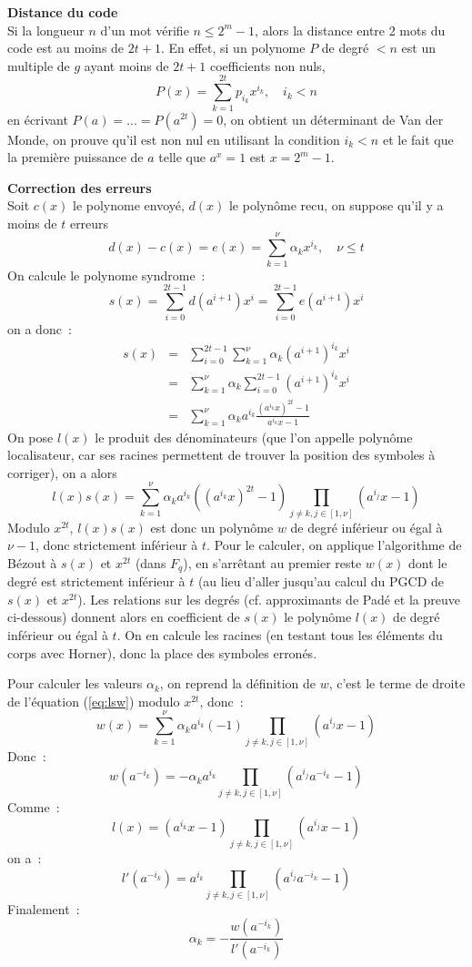 \documentclass[a4paper,11pt]{article}
\begin{document}
{\bf Distance du code}\\
Si la longueur $n$ d'un mot v\'erifie
$n \leq 2^m-1$, alors la distance entre 2 mots du code est au moins
de $2t+1$.
En effet, si un polynome $P$ de degr\'e $<n$ est un multiple de $g$
ayant moins de $2t+1$ coefficients non nuls,
\[ P(x)=\sum_{k=1}^{2t} p_{i_k} x^{i_k}, \quad i_k<n \]
en \'ecrivant $P(a)=...=P(a^{2t})=0$, on obtient
un d\'eterminant de Van der Monde, on prouve qu'il est non nul en
utilisant la condition $i_k<n$ et le fait que la premi\`ere puissance
de $a$ telle que $a^x=1$ est $x=2^m-1$.

{\bf Correction des erreurs}\\ 
Soit $c(x)$ le polynome envoy\'e, $d(x)$
le polyn\^ome recu, on suppose qu'il y a moins de $t$ erreurs
\[d(x)-c(x)=e(x)= \sum_{k=1}^\nu \alpha_k x^{i_k}, \quad \nu \leq t\]
On calcule le polynome syndrome~:
\[ s(x)= \sum_{i=0}^{2t-1}d(a^{i+1}) x^i= \sum_{i=0}^{2t-1}e(a^{i+1}) x^i \]
on a donc~:
\begin{eqnarray*} 
s(x) &= &\sum_{i=0}^{2t-1}\sum_{k=1}^\nu \alpha_k (a^{i+1})^{i_k} x^i \\
&=& \sum_{k=1}^\nu \alpha_k \sum_{i=0}^{2t-1}(a^{i+1})^{i_k} x^i\\
&=& \sum_{k=1}^\nu \alpha_k a^{i_k} \frac{(a^{i_k}x)^{2t}-1}{a^{i_k}x-1}
\end{eqnarray*}
On pose $l(x)$ le produit des d\'enominateurs (que l'on appelle polyn\^ome
localisateur, car ses racines permettent de trouver la position
des symboles \`a corriger), on a alors
\begin{equation} \label{eq:lsw}
 l(x) s(x) = \sum_{k=1}^\nu \alpha_k a^{i_k} ( (a^{i_k}x)^{2t} -1 )
\prod_{j\neq k, j \in [1,\nu]} (a^{i_j}x -1) 
\end{equation}
Modulo $x^{2t}$, $l(x)s(x)$ est donc un polyn\^ome $w$ de degr\'e inf\'erieur
ou \'egal \`a $\nu -1$, donc strictement inf\'erieur \`a $t$.
Pour le calculer, on applique l'algorithme de B\'ezout à $s(x)$
et $x^{2t}$ (dans $F_q$), en s'arr\^etant au premier reste $w(x)$
dont le degr\'e est strictement inf\'erieur \`a $t$ (au lieu
d'aller jusqu'au calcul du PGCD de $s(x)$ et $x^{2t}$).
Les relations sur les degr\'es (cf. approximants de Pad\'e et
la preuve ci-dessous) donnent
alors en coefficient de $s(x)$ le polyn\^ome $l(x)$ de degr\'e inf\'erieur ou
\'egal \`a $t$. On en calcule les racines (en testant tous les \'el\'ements
du corps avec Horner), donc la place des symboles erron\'es.

Pour calculer les valeurs $\alpha_k$, on reprend la définition de $w$,
c'est le terme de droite de l'équation (\ref{eq:lsw}) modulo $x^{2t}$,
donc~:
\[ w(x)=\sum_{k=1}^\nu \alpha_k a^{i_k} (-1)
\prod_{j\neq k, j \in [1,\nu]} (a^{i_j}x-1) \]
Donc~:
\[ w(a^{-i_k}) = - \alpha_k a^{i_k}  
\prod_{j\neq k, j \in [1,\nu]} (a^{i_j} a^{-i_k} -1) \]
Comme~:
\[ l(x)=(a^{i_k}x-1)\prod_{j\neq k, j \in [1,\nu]} (a^{i_j}x-1) \]
on a~:
\[ l'(a^{-i_k})=a^{i_k}\prod_{j\neq k, j \in [1,\nu]} (a^{i_j}a^{-i_k}-1) \]
Finalement~:
\[ \alpha_k = -\frac{w(a^{-i_k})}{l'(a^{-i_k})} \]
\end{document}
